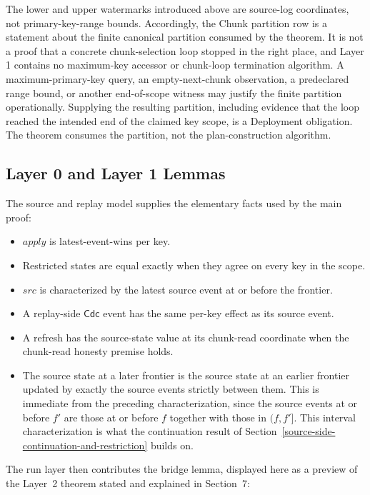 \documentclass[letterpaper,10pt,twocolumn]{article}
\newcommand{\Apply}{\mathit{apply}}
\newcommand{\Src}{\mathit{src}}
\providecommand{\tightlist}{\setlength{\itemsep}{0pt}\setlength{\parskip}{0pt}}
\begin{document}
The lower and upper watermarks introduced above are source-log
coordinates, not primary-key-range bounds. Accordingly, the Chunk
partition row is a statement about the finite canonical partition
consumed by the theorem. It is not a proof that a concrete
chunk-selection loop stopped in the right place, and Layer 1 contains no
maximum-key accessor or chunk-loop termination algorithm. A
maximum-primary-key query, an empty-next-chunk observation, a
predeclared range bound, or another end-of-scope witness may justify the
finite partition operationally. Supplying the resulting partition,
including evidence that the loop reached the intended end of the
claimed key scope, is a Deployment obligation. The theorem consumes the
partition, not the plan-construction algorithm.

\subsection{Layer 0 and Layer 1
Lemmas}\label{layer-0-and-layer-1-lemmas}

The source and replay model supplies the elementary facts used by the
main proof:

\begin{itemize}\tightlist
\item $\Apply$ is latest-event-wins per key.
\item Restricted states are equal exactly when they agree on every key
  in the scope.
\item $\Src$ is characterized by the latest source event at or before
  the frontier.
\item A replay-side $\mathsf{Cdc}$ event has the same per-key effect as
  its source event.
\item A refresh has the source-state value at its chunk-read coordinate
  when the chunk-read honesty premise holds.
\item The source state at a later frontier is the source state at an
  earlier frontier updated by exactly the source events strictly
  between them. This is immediate from the preceding characterization, since
  the source events at or before $f'$ are those at or before $f$
  together with those in $(f,f']$. This interval characterization is
  what the continuation result of
  Section~\ref{source-side-continuation-and-restriction} builds on.
\end{itemize}

The run layer then contributes the bridge lemma, displayed here as a
preview of the Layer~2 theorem stated and explained in Section~7:
\end{document}
